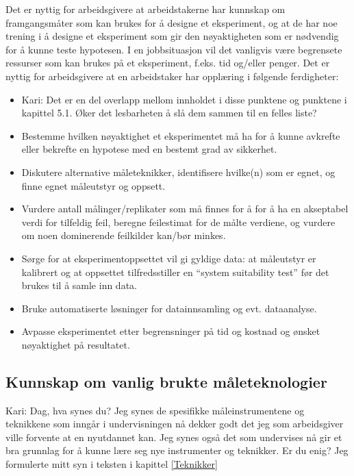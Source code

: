 \documentclass{article}
\begin{document}
Det er nyttig for arbeidsgivere at arbeidstakerne har kunnskap om framgangsmåter som kan brukes for å designe et eksperiment, og at de har noe trening i å designe et eksperiment som gir den nøyaktigheten som er nødvendig for å kunne teste hypotesen. I en jobbsituasjon vil det vanligvis være begrensete ressurser som kan brukes på et eksperiment, f.eks. tid og/eller penger.
Det er nyttig for arbeidsgivere at en arbeidstaker har opplæring i følgende ferdigheter:
\begin{itemize}
  \item {\color{red} Kari: Det er en del overlapp mellom innholdet i disse punktene og punktene i kapittel 5.1. Øker det lesbarheten å slå dem sammen til en felles liste?}
  \item Bestemme hvilken nøyaktighet et eksperimentet må ha for å kunne avkrefte eller bekrefte en hypotese med en bestemt grad av sikkerhet.
  \item Diskutere alternative måleteknikker, identifisere hvilke(n) som er egnet, og finne egnet måleutstyr og oppsett.
  \item Vurdere antall målinger/replikater som må finnes for å for å ha en akseptabel verdi for tilfeldig feil, beregne feilestimat for de målte verdiene, og vurdere om noen dominerende feilkilder kan/bør minkes.
  \item Sørge for at eksperimentoppsettet vil gi gyldige data: at måleutstyr er kalibrert og at oppsettet tilfredsstiller en ``system suitability test'' før det brukes til å samle inn data.
  \item Bruke automatiserte løsninger for datainnsamling og evt. dataanalyse.
  \item Avpasse eksperimentet etter begrensninger på tid og kostnad og ønsket nøyaktighet på resultatet.
\end{itemize}

\subsection{Kunnskap om vanlig brukte måleteknologier}

{\color{red} Kari: Dag, hva synes du? Jeg synes de spesifikke måleinstrumentene og teknikkene som inngår i undervisningen nå dekker godt det jeg som arbeidsgiver ville forvente at en nyutdannet kan. Jeg synes også det som undervises nå gir et bra grunnlag for å kunne lære seg nye instrumenter og teknikker. Er du enig? Jeg formulerte mitt syn i teksten i kapittel \ref{Teknikker} }
\end{document}
